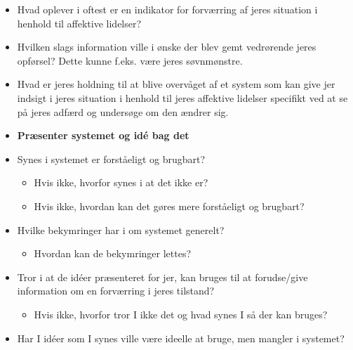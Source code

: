 \begin{itemize}
\item Hvad oplever i oftest er en indikator for forværring af jeres situation i henhold til affektive lidelser?
\item Hvilken slags information ville i ønske der blev gemt vedrørende jeres opførsel? Dette kunne f.eks. være jeres søvnmønstre.
\item Hvad er jeres holdning til at blive overvåget af et system som kan give jer indsigt i jeres situation i henhold til jeres affektive lidelser specifikt ved at se på jeres adfærd og undersøge om den ændrer sig.
\item \textbf{Præsenter systemet og idé bag det}
\item {Synes i systemet er forståeligt og brugbart?
	   \begin{itemize}
	   \item Hvis ikke, hvorfor synes i at det ikke er?
	   \item Hvis ikke, hvordan kan det gøres mere forståeligt og brugbart?
	   \end{itemize}}
\item {Hvilke bekymringer har i om systemet generelt?
	  \begin{itemize}
	  \item Hvordan kan de bekymringer lettes?
	  \end{itemize}}
\item {Tror i at de idéer præsenteret for jer, kan bruges til at forudse/give information om en forværring i jeres tilstand?
	   \begin{itemize}
	   \item Hvis ikke, hvorfor tror I ikke det og hvad synes I så der kan bruges?
	   \end{itemize}}
\item Har I idéer som I synes ville være ideelle at bruge, men mangler i systemet?

\end{itemize}
